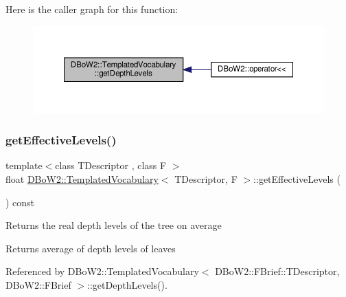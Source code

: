 Here is the caller graph for this function\+:\nopagebreak
\begin{figure}[H]
\begin{center}
\leavevmode
\includegraphics[width=350pt]{classDBoW2_1_1TemplatedVocabulary_a5a7d1b3ad0c705705d516a9a144e3f38_icgraph}
\end{center}
\end{figure}
\mbox{\label{classDBoW2_1_1TemplatedVocabulary_ae67da4c7b30c15ed4faba2ad6ed4549e}} 
\subsubsection{\texorpdfstring{get\+Effective\+Levels()}{getEffectiveLevels()}}
{\footnotesize\ttfamily template$<$class T\+Descriptor , class F $>$ \\
float \hyperlink{classDBoW2_1_1TemplatedVocabulary}{D\+Bo\+W2\+::\+Templated\+Vocabulary}$<$ T\+Descriptor, F $>$\+::get\+Effective\+Levels (\begin{DoxyParamCaption}{ }\end{DoxyParamCaption}) const}

Returns the real depth levels of the tree on average \begin{DoxyReturn}{Returns}
average of depth levels of leaves 
\end{DoxyReturn}


Referenced by D\+Bo\+W2\+::\+Templated\+Vocabulary$<$ D\+Bo\+W2\+::\+F\+Brief\+::\+T\+Descriptor, D\+Bo\+W2\+::\+F\+Brief $>$\+::get\+Depth\+Levels().

